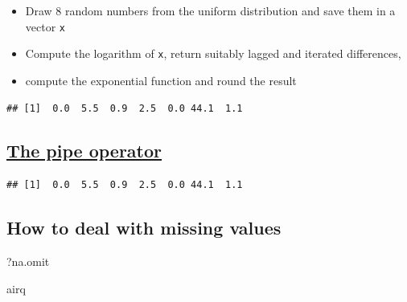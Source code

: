 \documentclass[10pt,]{article}
\newenvironment{Shaded}{\begin{snugshade}}{\end{snugshade}}
\newcommand{\KeywordTok}[1]{\textcolor[rgb]{0.13,0.29,0.53}{\textbf{#1}}}
\newcommand{\DecValTok}[1]{\textcolor[rgb]{0.00,0.00,0.81}{#1}}
\newcommand{\StringTok}[1]{\textcolor[rgb]{0.31,0.60,0.02}{#1}}
\newcommand{\CommentTok}[1]{\textcolor[rgb]{0.56,0.35,0.01}{\textit{#1}}}
\newcommand{\OperatorTok}[1]{\textcolor[rgb]{0.81,0.36,0.00}{\textbf{#1}}}
\newcommand{\NormalTok}[1]{#1}
\providecommand{\tightlist}{%
  \setlength{\itemsep}{0pt}\setlength{\parskip}{0pt}}
\begin{document}
\begin{itemize}
\tightlist
\item
  Draw 8 random numbers from the uniform distribution and save them in a
  vector \texttt{x}
\item
  Compute the logarithm of \texttt{x}, return suitably lagged and
  iterated differences,
\item
  compute the exponential function and round the result
\end{itemize}

\begin{verbatim}
## [1]  0.0  5.5  0.9  2.5  0.0 44.1  1.1
\end{verbatim}

\subsection{\texorpdfstring{\href{https://www.datacamp.com/community/tutorials/pipe-r-tutorial}{The
pipe operator}}{The pipe operator}}\label{the-pipe-operator}

\begin{Shaded}
\end{Shaded}

\begin{verbatim}
## [1]  0.0  5.5  0.9  2.5  0.0 44.1  1.1
\end{verbatim}

\subsection{How to deal with missing
values}\label{how-to-deal-with-missing-values}

\begin{Shaded}
\begin{Highlighting}[]
\NormalTok{?na.omit}
\end{Highlighting}
\end{Shaded}

\begin{Shaded}
\begin{Highlighting}[]
\NormalTok{airq}
\end{Highlighting}
\end{Shaded}
\end{document}
